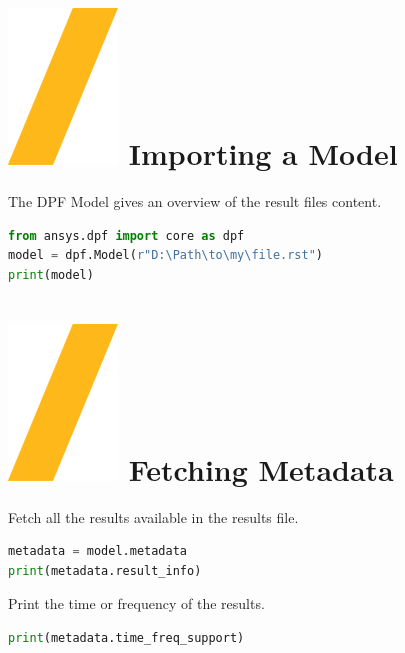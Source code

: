 \documentclass[9pt,landscape]{article}
\begin{document}
\begin{multicols}{3}
\setlength{\premulticols}{1pt}
\setlength{\postmulticols}{1pt}
\setlength{\multicolsep}{1pt}
\setlength{\columnsep}{2pt}


\section{\includegraphics[height=\fontcharht\font`\S]{slash.png} Importing a Model}
The DPF Model gives an overview of the result files content.
\begin{lstlisting}[language=Python]
from ansys.dpf import core as dpf
model = dpf.Model(r"D:\Path\to\my\file.rst")
print(model)
\end{lstlisting}


\section{\includegraphics[height=\fontcharht\font`\S]{slash.png} Fetching Metadata}
Fetch all the results available in the results file.
\begin{lstlisting}[language=Python]
metadata = model.metadata
print(metadata.result_info)
\end{lstlisting}

Print the time or frequency of the results.
\begin{lstlisting}[language=Python]
print(metadata.time_freq_support)
\end{lstlisting}


\end{multicols}
\end{document}
